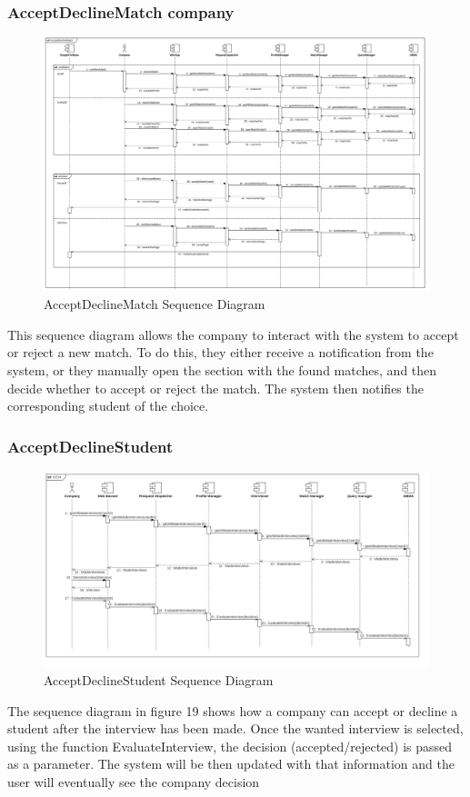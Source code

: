 \documentclass{article}
\begin{document}
\subsubsection{AcceptDeclineMatch company}
\begin{figure}[H]
    \centering
    \includegraphics[width=1\linewidth]{SequenceDiagram/AccDeclMatchSD.png}
    \caption{AcceptDeclineMatch Sequence Diagram}
    \label{fig:enter-label}
\end{figure}
This sequence diagram allows the company to interact with the system to accept or reject a new match. To do this, they either receive a notification from the system, or they manually open the section with the found matches, and then decide whether to accept or reject the match. The system then notifies the corresponding student of the choice. 
\subsubsection{AcceptDeclineStudent}
\begin{figure}[H]
    \centering
    \includegraphics[width=1\linewidth]{SequenceDiagram/UC14.jpg}
    \caption{AcceptDeclineStudent  Sequence Diagram}
    \label{fig:enter-label}
\end{figure}
The sequence diagram in figure 19 shows how a company can accept or decline a student after the interview has been made. Once the wanted interview is selected, using the function EvaluateInterview, the decision (accepted/rejected) is passed as a parameter. The system will be then updated with that information and the user will eventually see the company decision 
\end{document}
